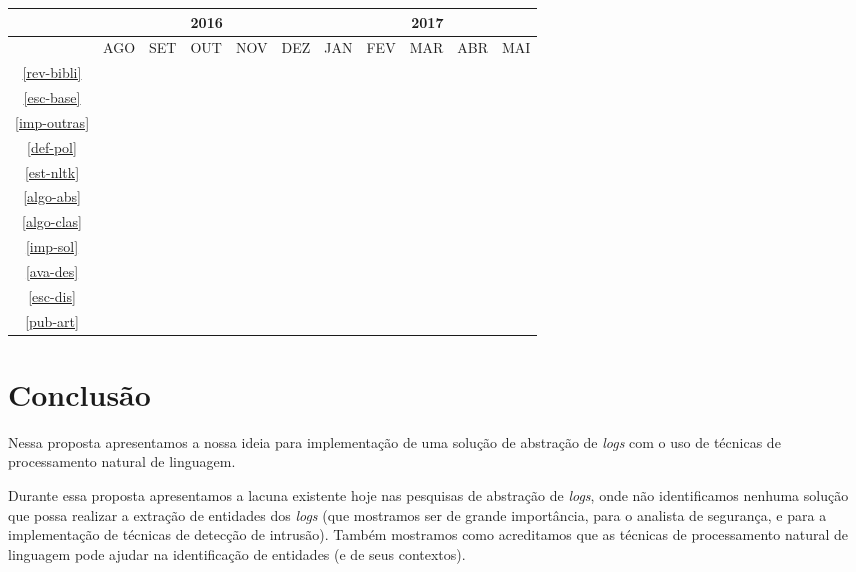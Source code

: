 \documentclass[
	12pt,				%
	openright,			%
	twoside,			%
	a4paper,			%
	english,			%
	spanish,			%
	brazil,				%
	]{abntex2}
\begin{document}
\begin{table}[!htbp]
	\centering
	\begin{tabular}{|c|c|c|c|c|c|c|c|c|c|c|}
		\hline
		&\multicolumn{5}{c|}{2016}&\multicolumn{5}{c|}{2017}\\
		\hline
		&AGO&SET&OUT&NOV&DEZ&JAN&FEV&MAR&ABR&MAI\\
		\hline
		\ref{rev-bibli}& \textbullet & \textbullet & \textbullet & \textbullet & \textbullet & \textbullet & \textbullet & \textbullet & \textbullet & \textbullet \\
		\hline
		\ref{esc-base}& \textbullet & \textbullet &&&&&&&&\\
		\hline
		\ref{imp-outras}& \textbullet &\textbullet & \textbullet &&&&&&&\\
		\hline
		\ref{def-pol}& &&&\textbullet &\textbullet &&&&&\\
		\hline
		\ref{est-nltk}&&\textbullet &\textbullet &\textbullet &\textbullet &&&&&\\
		\hline
		\ref{algo-abs}& &&\textbullet&\textbullet&\textbullet&&&&&\\
		\hline
		\ref{algo-clas}& &&&\textbullet&\textbullet&\textbullet&\textbullet&&&\\
		\hline
		\ref{imp-sol}&&&&&&\textbullet&\textbullet&\textbullet&&\\
		\hline
		\ref{ava-des}&&&&&&&\textbullet&\textbullet&\textbullet&\textbullet\\
		\hline
		\ref{esc-dis}&&&&&&\textbullet&\textbullet&\textbullet&\textbullet&\textbullet\\
		\hline				
		\ref{pub-art}& & & & & \textbullet & & & & & \textbullet \\
		\hline					
	\end{tabular}
\end{table}

\chapter{Conclusão}\label{chap:conclusao}
Nessa proposta apresentamos a nossa ideia para implementação de uma solução de abstração de \emph{logs} com o uso de técnicas de processamento natural de linguagem.

Durante essa proposta apresentamos a lacuna existente hoje nas pesquisas de abstração de \emph{logs}, onde não identificamos nenhuma solução que possa realizar a extração de entidades dos \emph{logs} (que mostramos ser de grande importância, para o analista de segurança, e para a implementação de técnicas de detecção de intrusão). Também mostramos como acreditamos que as técnicas de processamento natural de linguagem pode ajudar na identificação de entidades (e de seus contextos).
\end{document}
